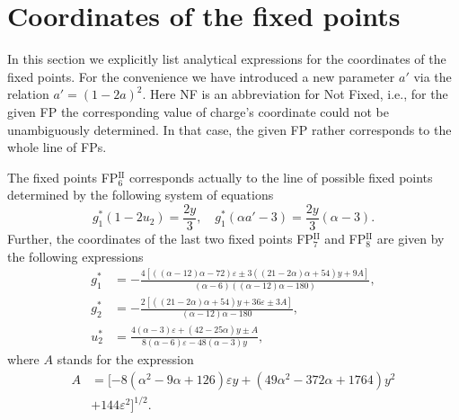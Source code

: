 \documentclass[aps,pre,url,twocolumn,superscriptaddress]{revtex4-1}
\def\eps{\varepsilon}
\newcommand{\fp}[2]{FP$^{\textrm{#1}}_{#2}$}
\begin{document}
% 
\section{Coordinates of the fixed points \label{app:fixed}}
In this section we explicitly list analytical expressions for the coordinates of the fixed points.
For the convenience we have introduced a new parameter $a'$ via the relation
$a'=(1-2a)^2$. 
Here NF is an abbreviation for Not Fixed, i.e., for the given FP the corresponding value
of charge's coordinate could not be unambiguously determined. In that case, the given FP
rather corresponds to the whole line of FPs.

The fixed points \fp{II}{6} corresponds actually to the line of possible fixed points
determined by the following system of equations
\begin{equation*}
   g_1^*(1-2u_2) = \frac{2y}{3},\quad g_1^*(\alpha a'-3) = \frac{2y}{3}(\alpha-3).
\end{equation*}
Further, the coordinates of the last two fixed points 
\fp{II}{7} and \fp{II}{8} are given by the following expressions
\begin{align*}
  g_1^{*} & =  -\frac{4 \left[((\alpha -12) \alpha -72) \eps \pm
  3 ((21-2 \alpha ) \alpha +54) y +9 A\right]}{(\alpha-6) ((\alpha -12) \alpha -180)}, \\
  g_2^{*} & =  -\frac{2 \left[ ((21-2 \alpha ) \alpha +54) y+36 \eps \pm 
  3 A \right]}{(\alpha -12) \alpha-180}, \\
  u_2^{*} & =  \frac{4 (\alpha -3) \eps+(42-25 \alpha ) y\pm A}{8 (\alpha -6) 
  \eps -48 (\alpha -3) y},
\end{align*}
where $A$ stands for the expression
\begin{align*}
  A& =[-8 (\alpha^2 -9\alpha +126) \eps  y+(49\alpha^2 -372\alpha+1764) y^2
  \nonumber \\
  & + 144 \eps^2]^{1/2}.
  \label{eq:defA}
\end{align*}
\end{document}
